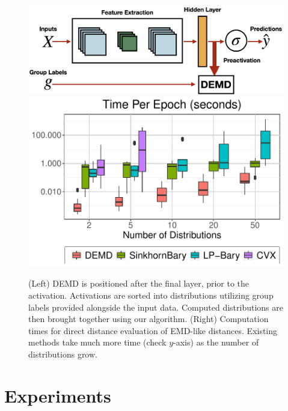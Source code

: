\begin{figure}[t]
\vspace{-0.1in}
    \centering
    \raisebox{\baselineskip}%
    {\includegraphics[width=0.55\columnwidth]{6_demd/figs/net_diff_new.png}%
    }%
    \;
    \includegraphics[width=0.35\columnwidth]{6_demd/figs/Distance_Comparisons.pdf}
    \caption[DEMD regularization and computation speedups]{\label{fig:dists} (Left) DEMD is positioned after the final layer, prior to the activation. Activations are sorted into distributions utilizing group labels provided alongside the input data. Computed distributions are then brought together using our algorithm. (Right) Computation times for direct distance evaluation of EMD-like distances. Existing methods take much more time {\color{blue}(check $y$-axis)} as the number of distributions grow.}
    \vspace{-5pt}
\end{figure}

\section{Experiments}
\label{sec:results}
\vspace{-5pt}


